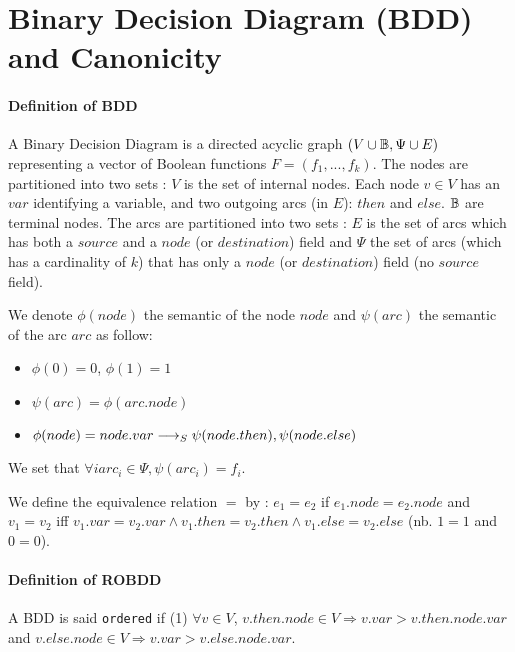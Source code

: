 \documentclass[a4paper,10pt]{article}
\begin{document}
\section{Binary Decision Diagram (BDD) and Canonicity}

\paragraph{Definition of BDD\\}

A Binary Decision Diagram is a directed acyclic graph $(V\cup \mathbb{B}, \Psi \cup E)$ representing a vector of Boolean functions $F=(f_1, ..., f_k)$.
The nodes are partitioned into two sets : $V$ is the set of internal nodes.
Each node $v\in V$ has an $var$ identifying a variable, and two outgoing arcs (in $E$): $then$ and $else$. $\mathbb{B}$ are terminal nodes.
The arcs are partitioned into two sets : $E$ is the set of arcs which has both a $source$ and a $node$ (or $destination$) field and $\Psi$ the set of arcs (which has a cardinality of $k$) that has only a $node$ (or $destination$) field (no $source$ field).


We denote $\phi(node)$ the semantic of the node $node$ and $\psi(arc)$ the semantic of the arc $arc$ as follow:\begin{itemize}
\item $\phi(0) = 0$, $\phi(1) = 1$
\item $\psi(arc) = \phi(arc.node)$
\item $\phi(node) = node.var \longrightarrow_S \psi(node.then), \psi(node.else)$
\end{itemize}

We set that $\forall i arc_i \in \Psi, \psi(arc_i) = f_i$.

We define the equivalence relation $=$ by : $e_1 = e_2$ if $e_1.node = e_2.node$ and $v_1 = v_2$ iff $v_1.var = v_2.var \land v_1.then = v_2.then \land v_1.else = v_2.else$ (nb. $1=1$ and $0=0$).

\paragraph{Definition of ROBDD\\}
A BDD is said \texttt{ordered} if (1) $\forall v\in V$, $v.then.node \in V \Rightarrow v.var > v.then.node.var$ and $v.else.node \in V \Rightarrow v.var > v.else.node.var$.
\end{document}
